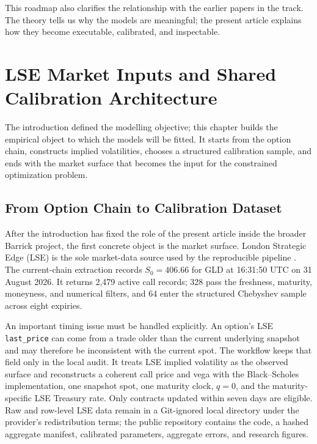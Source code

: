 \documentclass[a4paper,10pt,titlepage,oneside,openany]{book}
\theoremstyle{plain}
\theoremstyle{definition}
\theoremstyle{remark}
\begin{document}
This roadmap also clarifies the relationship with the earlier papers in the track. The theory tells us why the models are meaningful; the present article explains how they become executable, calibrated, and inspectable.


\chapter{LSE Market Inputs and Shared Calibration Architecture}

The introduction defined the modelling objective; this chapter builds the empirical object to which the models will be fitted. It starts from the option chain, constructs implied volatilities, chooses a structured calibration sample, and ends with the market surface that becomes the input for the constrained optimization problem.

\section{From Option Chain to Calibration Dataset}

After the introduction has fixed the role of the present article inside the broader Barrick project, the first concrete object is the market surface. London Strategic Edge (LSE) is the sole market-data source used by the reproducible pipeline \cite{LondonStrategicEdge2026}. The current-chain extraction records \(S_0=406.66\) for GLD at 16:31:50 UTC on 31 August 2026. It returns 2,479 active call records; 328 pass the freshness, maturity, moneyness, and numerical filters, and 64 enter the structured Chebyshev sample across eight expiries.

An important timing issue must be handled explicitly. An option's LSE \texttt{last\_price} can come from a trade older than the current underlying snapshot and may therefore be inconsistent with the current spot. The workflow keeps that field only in the local audit. It treats LSE implied volatility as the observed surface and reconstructs a coherent call price and vega with the Black--Scholes implementation, one snapshot spot, one maturity clock, \(q=0\), and the maturity-specific LSE Treasury rate. Only contracts updated within seven days are eligible. Raw and row-level LSE data remain in a Git-ignored local directory under the provider's redistribution terms; the public repository contains the code, a hashed aggregate manifest, calibrated parameters, aggregate errors, and research figures.
\end{document}
